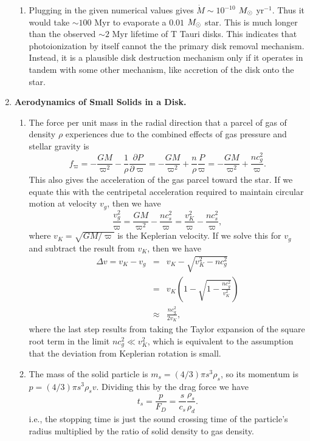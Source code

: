 \begin{enumerate}
\begin{enumerate}
\item Plugging in the given numerical values gives $\dot{M} \sim 10^{-10}$ $M_{\odot}$ yr$^{-1}$. Thus it would take $\sim 100$ Myr to evaporate a $0.01$ $M_{\odot}$ star. This is much longer than the observed $\sim 2$ Myr lifetime of T Tauri disks. This indicates that photoionization by itself cannot the the primary disk removal mechanism. Instead, it is a plausible disk destruction mechanism only if it operates in tandem with some other mechanism, like accretion of the disk onto the star.

\end{enumerate}

\item {\bf Aerodynamics of Small Solids in a Disk.}

\begin{enumerate}

\item The force per unit mass in the radial direction that a parcel of gas of density $\rho$ experiences due to the combined effects of gas pressure and stellar gravity is
\begin{displaymath}
f_\varpi = -\frac{G M}{\varpi^2} - \frac{1}{\rho}\frac{\partial P}{\partial \varpi} = -\frac{GM}{\varpi^2} + \frac{n}{\rho}\frac{P}{\varpi} = -\frac{GM}{\varpi^2} + \frac{n c_g^2}{\varpi}.
\end{displaymath}
This also gives the acceleration of the gas parcel toward the star. If we equate this with the centripetal acceleration required to maintain circular motion at velocity $v_g$, then we have
\begin{displaymath}
\frac{v_g^2}{\varpi} = \frac{GM}{\varpi^2} - \frac{n c_s^2}{\varpi} = \frac{v_K^2}{\varpi} - \frac{n c_s^2}{\varpi},
\end{displaymath}
where $v_K = \sqrt{GM/\varpi}$ is the Keplerian velocity. If we solve this for $v_g$ and subtract the result from $v_K$, then we have
\begin{eqnarray*}
\Delta v = v_K - v_g & = & v_K - \sqrt{v_K^2 - n c_g^2} \\
& = & v_K \left(1 - \sqrt{1 - \frac{n c_g^2}{v_K^2}}\right) \\
& \approx & \frac{n c_g^2}{2 v_K},
\end{eqnarray*}
where the last step results from taking the Taylor expansion of the square root term in the limit $nc_g^2 \ll v_K^2$, which is equivalent to the assumption that the deviation from Keplerian rotation is small.

\item The mass of the solid particle is $m_s = (4/3)\pi s^3 \rho_s$, so its momentum is $p = (4/3)\pi s^3 \rho_s v$. Dividing this by the drag force we have
\begin{displaymath}
t_s = \frac{p}{F_D} = \frac{s}{c_s}\frac{\rho_s}{\rho_d}.
\end{displaymath}
i.e., the stopping time is just the sound crossing time of the particle's radius multiplied by the ratio of solid density to gas density.


\end{enumerate}
\end{enumerate}
